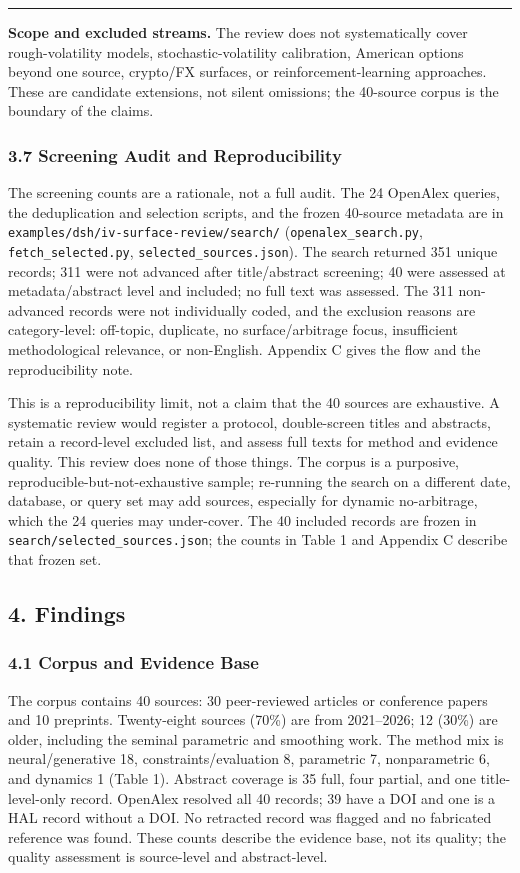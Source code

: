 \documentclass[11pt]{article}
\begin{document}
\par\medskip\hrule\medskip
\textbf{Scope and excluded streams.} The review does not systematically cover rough-volatility models, stochastic-volatility calibration, American options beyond one source, crypto/FX surfaces, or reinforcement-learning approaches. These are candidate extensions, not silent omissions; the 40-source corpus is the boundary of the claims.

\subsubsection*{3.7 Screening Audit and Reproducibility}
The screening counts are a rationale, not a full audit. The 24 OpenAlex queries, the deduplication and selection scripts, and the frozen 40-source metadata are in \texttt{examples/dsh/iv-surface-review/search/} (\texttt{openalex\_search.py}, \texttt{fetch\_selected.py}, \texttt{selected\_sources.json}). The search returned 351 unique records; 311 were not advanced after title/abstract screening; 40 were assessed at metadata/abstract level and included; no full text was assessed. The 311 non-advanced records were not individually coded, and the exclusion reasons are category-level: off-topic, duplicate, no surface/arbitrage focus, insufficient methodological relevance, or non-English. Appendix C gives the flow and the reproducibility note.

This is a reproducibility limit, not a claim that the 40 sources are exhaustive. A systematic review would register a protocol, double-screen titles and abstracts, retain a record-level excluded list, and assess full texts for method and evidence quality. This review does none of those things. The corpus is a purposive, reproducible-but-not-exhaustive sample; re-running the search on a different date, database, or query set may add sources, especially for dynamic no-arbitrage, which the 24 queries may under-cover. The 40 included records are frozen in \texttt{search/selected\_sources.json}; the counts in Table 1 and Appendix C describe that frozen set.

\subsection*{4. Findings}
\subsubsection*{4.1 Corpus and Evidence Base}
The corpus contains 40 sources: 30 peer-reviewed articles or conference papers and 10 preprints. Twenty-eight sources (70\%) are from 2021–2026; 12 (30\%) are older, including the seminal parametric and smoothing work. The method mix is neural/generative 18, constraints/evaluation 8, parametric 7, nonparametric 6, and dynamics 1 (Table 1). Abstract coverage is 35 full, four partial, and one title-level-only record. OpenAlex resolved all 40 records; 39 have a DOI and one is a HAL record without a DOI. No retracted record was flagged and no fabricated reference was found. These counts describe the evidence base, not its quality; the quality assessment is source-level and abstract-level.
\end{document}
